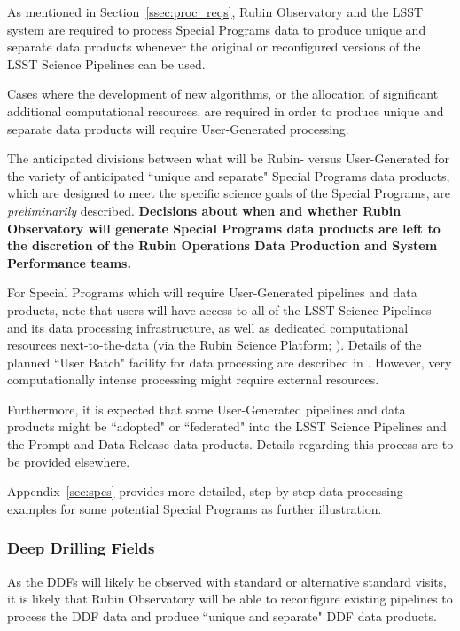 \documentclass[DM,lsstdoc,toc]{lsstdoc}
\begin{document}
As mentioned in Section~\ref{ssec:proc_reqs}, Rubin Observatory and the LSST system are required to process Special Programs data to produce unique and separate data products whenever the original or reconfigured versions of the LSST Science Pipelines can be used.

Cases where the development of new algorithms, or the allocation of significant additional computational resources, are required in order to produce unique and separate data products will require User-Generated processing.

The anticipated divisions between what will be Rubin- versus User-Generated for the variety of anticipated ``unique and separate" Special Programs data products, which are designed to meet the specific science goals of the Special Programs, are {\it preliminarily} described.
{\bf Decisions about when and whether Rubin Observatory will generate Special Programs data products are left to the discretion of the Rubin Operations Data Production and System Performance teams.}

For Special Programs which will require User-Generated pipelines and data products, note that users will have access to all of the LSST Science Pipelines and its data processing infrastructure, as well as dedicated computational resources next-to-the-data (via the Rubin Science Platform; ).
Details of the planned ``User Batch" facility for data processing are described in .
However, very computationally intense processing might require external resources. 

Furthermore, it is expected that some User-Generated pipelines and data products might be ``adopted" or ``federated" into the LSST Science Pipelines and the Prompt and Data Release data products. 
Details regarding this process are to be provided elsewhere.

Appendix~\ref{sec:spcs} provides more detailed, step-by-step data processing examples for some potential Special Programs as further illustration. 

\subsubsection{Deep Drilling Fields}

As the DDFs will likely be observed with standard or alternative standard visits, it is likely that Rubin Observatory will be able to reconfigure existing pipelines to process the DDF data and produce ``unique and separate" DDF data products.
\end{document}
